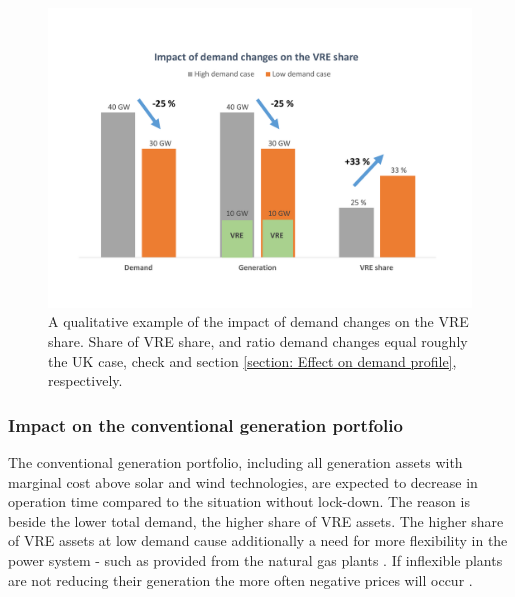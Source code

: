 \documentclass[energies,article,submit,moreauthors,pdftex]{Definitions/mdpi}
\begin{document}
\begin{figure}[H]
\centering
\hspace{-25pt}\includegraphics[trim={0cm 2cm 0cm 2cm},clip,width=1\textwidth]{Graphics/Illustrative-VRE-share-increase.pdf}
\caption{A qualitative example of the impact of demand changes on the VRE share. Share of VRE share, and ratio demand changes equal roughly the UK case, check \protect\cite{ENTSO-E2020ENTSO-EPlatform} and section \protect\ref{section: Effect on demand profile}, respectively.} %
\label{fig:generation_effects}
\end{figure} 


\subsubsection{Impact on the conventional generation portfolio}

The conventional generation portfolio, including all generation assets with marginal cost above solar and wind technologies, are expected to decrease in operation time compared to the situation without lock-down. The reason is beside the lower total demand, the higher share of VRE assets. The higher share of VRE assets at low demand cause additionally a need for more flexibility in the power system - such as provided from the natural gas plants \cite{Hirth2014TheVariability}. If inflexible plants are not reducing their generation the more often negative prices will occur \cite{IEA2016Re-poweringSystems.,Cochran2013MarketSystems}.
\end{document}
